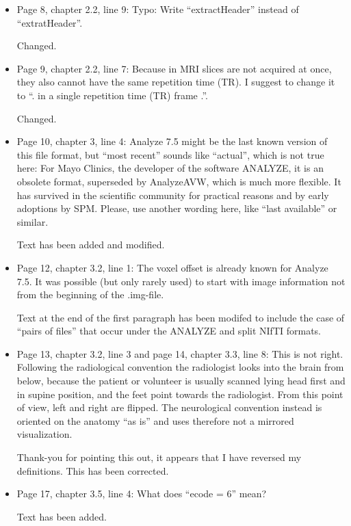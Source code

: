 \documentclass[11pt]{article}
\begin{document}
\begin{itemize}
\item Page 8, chapter 2.2, line 9: Typo: Write ``extractHeader''
  instead of ``extratHeader''.

  Changed.

\item Page 9, chapter 2.2, line 7: Because in MRI slices are not
  acquired at once, they also cannot have the same repetition time
  (TR). I suggest to change it to ``. in a single repetition time (TR)
  frame .''.

  Changed.

\item Page 10, chapter 3, line 4: Analyze 7.5 might be the last known
  version of this file format, but ``most recent'' sounds like
  ``actual'', which is not true here: For Mayo Clinics, the developer
  of the software ANALYZE, it is an obsolete format, superseded by
  AnalyzeAVW, which is much more flexible. It has survived in the
  scientific community for practical reasons and by early adoptions by
  SPM. Please, use another wording here, like ``last available'' or
  similar.

  Text has been added and modified.

\item Page 12, chapter 3.2, line 1: The voxel offset is already known
  for Analyze 7.5. It was possible (but only rarely used) to start
  with image information not from the beginning of the .img-file.

  Text at the end of the first paragraph has been modifed to include
  the case of ``pairs of files'' that occur under the ANALYZE and
  split NIfTI formats.

\item Page 13, chapter 3.2, line 3 and page 14, chapter 3.3, line 8:
  This is not right. Following the radiological convention the
  radiologist looks into the brain from below, because the patient or
  volunteer is usually scanned lying head first and in supine
  position, and the feet point towards the radiologist. From this
  point of view, left and right are flipped. The neurological
  convention instead is oriented on the anatomy ``as is'' and uses
  therefore not a mirrored visualization.

  Thank-you for pointing this out, it appears that I have reversed my
  definitions.  This has been corrected.

\item Page 17, chapter 3.5, line 4: What does ``ecode = 6'' mean?

  Text has been added.


\end{itemize}
\end{document}
